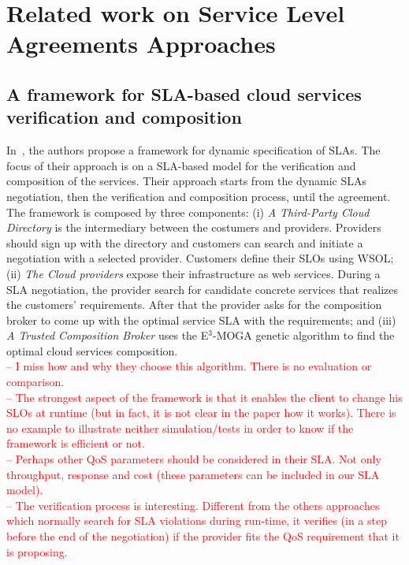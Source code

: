 \documentclass[12pt,a4paper,oneside]{article}
\author{Daniel Aguiar da Silva Carvalho}
\begin{document}
\section{Related work on Service Level Agreements Approaches}

\subsection{A framework for SLA-based cloud services verification and composition}

In~\cite{001}, the authors propose a framework for dynamic specification of SLAs. The focus of their approach is on a SLA-based model for the verification and composition of the services. Their approach starts from the dynamic SLAs negotiation, then the verification and composition process, until the agreement. The framework is composed by three components: (i) \textit{A Third-Party Cloud Directory} is the intermediary between the costumers and providers. Providers should sign up with the directory and customers can search and initiate a negotiation with a selected provider. Customers define their SLOs using WSOL; (ii) \textit{The Cloud providers} expose their infrastructure as web services. During a SLA negotiation, the provider search for candidate concrete services that realizes the customers' requirements. After that the provider asks for the composition broker to come up with the optimal service SLA with the requirements; and (iii) \textit{A Trusted Composition Broker} uses the E$^{3}$-MOGA genetic algorithm to find the optimal cloud services composition. \\
\textcolor{red}{-- I miss how and why they choose this algorithm. There is no evaluation or comparison. \\
-- The strongest aspect of the framework is that it enables the client to change his SLOs at runtime (but in fact, it is not clear in the paper how it works). There is no example to illustrate neither simulation/tests in order to know if the framework is efficient or not. \\
-- Perhaps other QoS parameters should be considered in their SLA. Not only throughput, response and cost (these parameters can be included in our SLA model). \\
-- The verification process is interesting. Different from the others approaches which normally search for SLA violations during run-time, it verifies (in a step before the end of the negotiation) if the provider fits the QoS requirement that it is proposing.}
\end{document}
